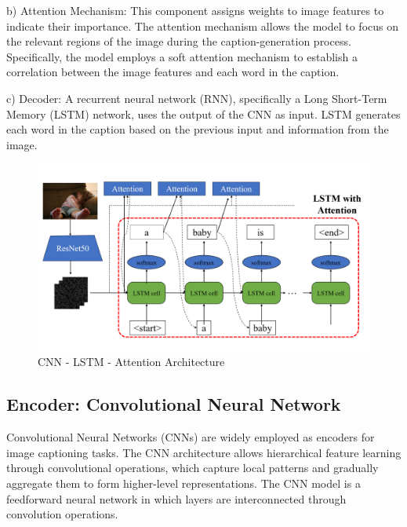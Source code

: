 \documentclass[conference]{IEEEtran}
\begin{document}
b) Attention Mechanism: This component assigns weights to image features to indicate their importance. The attention mechanism allows the model to focus on the relevant regions of the image during the caption-generation process. Specifically, the model employs a soft attention mechanism to establish a correlation between the image features and each word in the caption.


c) Decoder: A recurrent neural network (RNN), specifically a Long Short-Term Memory (LSTM) network, uses the output of the CNN as input. LSTM generates each word in the caption based on the previous input and information from the image.


\begin{figure}[h]
\includegraphics[width=\columnwidth]{assets/cnnlstmattention.png}
  \caption{CNN - LSTM - Attention Architecture}
  \label{fig:CNN_LSTM_Attention}
\end{figure}


\subsection{Encoder: Convolutional Neural Network\label{encoder}}
Convolutional Neural Networks (CNNs) are widely employed as encoders for image captioning tasks. The CNN architecture allows hierarchical feature learning through convolutional operations, which capture local patterns and gradually aggregate them to form higher-level representations. The CNN model is a feedforward neural network in which layers are interconnected through convolution operations. 
\end{document}
